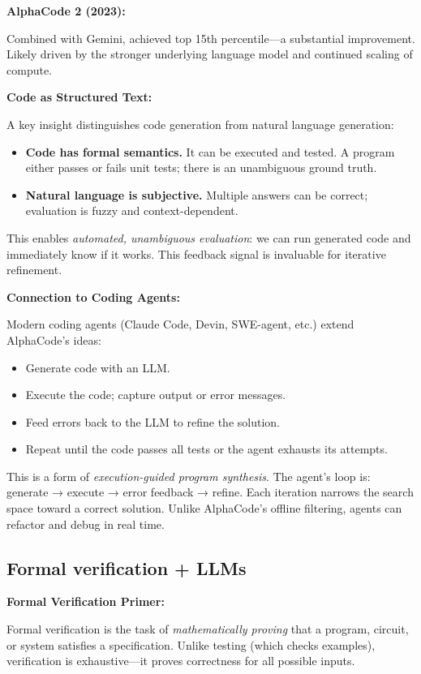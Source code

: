 \textbf{AlphaCode 2 (2023):}

Combined with Gemini, achieved top 15th percentile—a substantial improvement. Likely driven by the stronger underlying language model and continued scaling of compute.

\textbf{Code as Structured Text:}

A key insight distinguishes code generation from natural language generation:
\begin{itemize}
    \item \textbf{Code has formal semantics.} It can be executed and tested. A program either passes or fails unit tests; there is an unambiguous ground truth.
    \item \textbf{Natural language is subjective.} Multiple answers can be correct; evaluation is fuzzy and context-dependent.
\end{itemize}
This enables \emph{automated, unambiguous evaluation}: we can run generated code and immediately know if it works. This feedback signal is invaluable for iterative refinement.

\textbf{Connection to Coding Agents:}

Modern coding agents (Claude Code, Devin, SWE-agent, etc.) extend AlphaCode's ideas:
\begin{itemize}
    \item Generate code with an LLM.
    \item Execute the code; capture output or error messages.
    \item Feed errors back to the LLM to refine the solution.
    \item Repeat until the code passes all tests or the agent exhausts its attempts.
\end{itemize}
This is a form of \emph{execution-guided program synthesis}. The agent's loop is: generate → execute → error feedback → refine. Each iteration narrows the search space toward a correct solution. Unlike AlphaCode's offline filtering, agents can refactor and debug in real time.

\subsection{Formal verification + LLMs}

\textbf{Formal Verification Primer:}

Formal verification is the task of \emph{mathematically proving} that a program, circuit, or system satisfies a specification. Unlike testing (which checks examples), verification is exhaustive—it proves correctness for all possible inputs.

